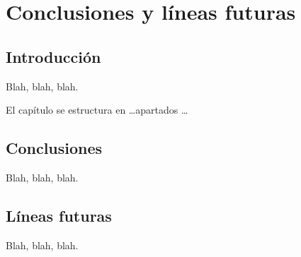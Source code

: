 %
%
%
% 
%
%
%
%

\chapter{Conclusiones y líneas futuras}
\label{cha:concl-y-line}


\section{Introducción}
\label{sec:introduccion-conclusiones}

Blah, blah, blah.

El capítulo se estructura en \ldots apartados \ldots



\section{Conclusiones}
\label{sec:conclusions}

Blah, blah, blah.



\section{Líneas futuras}
\label{sec:lineas-futuras}

Blah, blah, blah.




